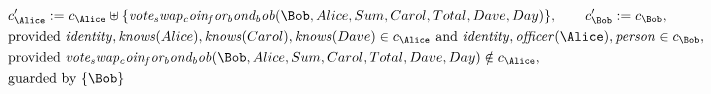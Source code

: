 \begin{align*}
&
c'_
{
\Alice
}
 := 
c_
{
\Alice
}
 \uplus 
\{
\mathit{
vote_swap_coin_for_bond_bob
}
(
\Bob
,
Alice
,
Sum
,
Carol
,
Total
,
Dave
,
Day
)
\}
, \qquad 
c'_
{
\Bob
}
 := 
c_
{
\Bob
}
,\\
&
\text{provided } 
\mathit{
identity
}
,
\mathit{
knows
}
(
Alice
)
,
\mathit{
knows
}
(
Carol
)
,
\mathit{
knows
}
(
Dave
)
 \in c_
{
\Alice
}
 \text{ and } 
\mathit{
identity
}
,
\mathit{
officer
}
(
\Alice
)
,
\mathit{
person
}
 \in c_
{
\Bob
}
,\\
&
\text{provided } 
\mathit{
vote_swap_coin_for_bond_bob
}
(
\Bob
,
Alice
,
Sum
,
Carol
,
Total
,
Dave
,
Day
)
 \notin c_
{
\Alice
}
,\\
&
\text{guarded by } \{
\Bob
\}
\end{align*}

